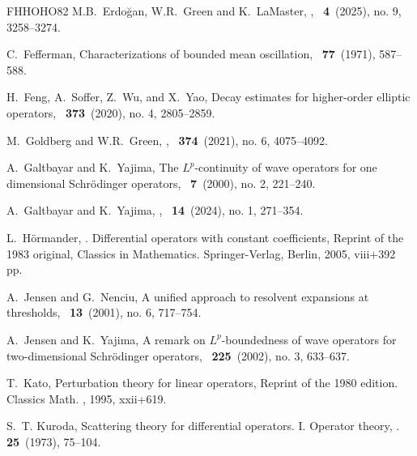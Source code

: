 \documentclass[reqno]{amsart}
\numberwithin{equation}{section}
\begin{document}
\begin{thebibliography}{FHHOHO82}
M.B.~Erdo\u{g}an, W.R.~Green and K.~LaMaster,
,
~{\bf 4}~(2025), no. 9, 3258--3274.


C.~Fefferman,
\newblock Characterizations of bounded mean oscillation,
~{\bf77}~(1971), 587--588.

H.~Feng, A.~Soffer, Z.~Wu, and X.~Yao,
\newblock Decay estimates for higher-order elliptic operators,
~{\bf373}~(2020), no. 4, 2805--2859.

M.~Goldberg and W.R.~Green,
,
~{\bf374}~(2021), no. 6, 4075--4092.

A.~Galtbayar and K.~Yajima,
\newblock The {$L^p$}-continuity of wave operators for one dimensional
  {S}chr\"{o}dinger operators,
~{\bf7}~(2000), no. 2, 221--240.

A.~Galtbayar and K.~Yajima,
,
~{\bf14}~(2024), no. 1, 271--354.

L.~H\"{o}rmander,
.
\newblock Differential operators with constant coefficients, Reprint of the
  1983 original,
\newblock Classics in Mathematics. Springer-Verlag, Berlin, 2005, viii+392 pp.

A.~Jensen and G.~Nenciu,
\newblock A unified approach to resolvent expansions at thresholds,
~{\bf13}~(2001), no. 6, 717--754.

A.~Jensen and K.~Yajima,
\newblock A remark on {$L^p$}-boundedness of wave operators for two-dimensional
  {S}chr\"{o}dinger operators,
~{\bf 225}~(2002), no. 3, 633--637.

T.~Kato,
\newblock Perturbation theory for linear operators, Reprint of the 1980 edition.
Classics Math. 
, 1995, xxii+619.


S.~T. Kuroda,
\newblock Scattering theory for differential operators. {I}. {O}perator theory,
. {\bf25}~(1973), 75--104.


\end{thebibliography}
\end{document}
